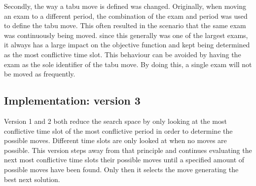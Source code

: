 Secondly, the way a tabu move is defined was changed. Originally, when moving an exam to a different period, the combination of the exam and period was used to define the tabu move. This often resulted in the scenario that the same exam was continuously being moved. since this generally was one of the largest exams, it always has a large impact on the objective function and kept being determined as the most conflictive time slot. This behaviour can be avoided by having the exam as the sole identifier of the tabu move. By doing this, a single exam will not be moved as frequently.

\subsection{Implementation: version 3}

Version 1 and 2 both reduce the search space by only looking at the most conflictive time slot of the most conflictive period in order to determine the possible moves. Different time slots are only looked at when no moves are possible. This version steps away from that principle and continues evaluating the next most conflictive time slots their possible moves until a specified amount of possible moves have been found. Only then it selects the move generating the best next solution.



